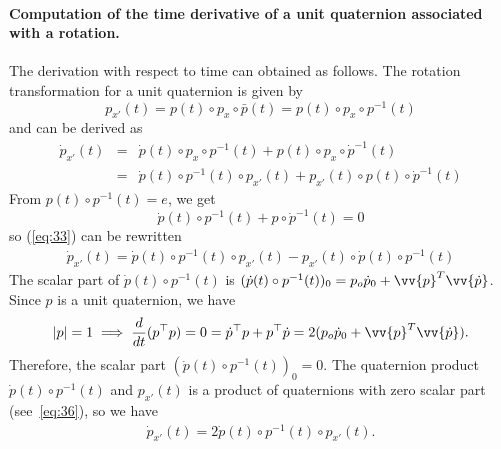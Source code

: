\paragraph{Computation of the time derivative of a unit  quaternion associated with a rotation.}
The derivation with respect to time can obtained as follows. The rotation transformation for a unit quaternion is given by
\begin{equation}
  \label{eq:33}
  p_{x'}(t) = p(t) \circ p_x \circ \bar p(t) =  p(t) \circ p_x \circ p^{-1}(t)
\end{equation}
and can be derived as
\begin{equation}
  \label{eq:33}
  \begin{array}{lcl}
    \dot p_{x'}(t) &=& \dot p(t) \circ p_x \circ p^{-1}(t) + p(t) \circ p_x \circ \dot p^{-1}(t) \\
                  &=& \dot p(t) \circ p^{-1}(t)  \circ   p_{x'}(t)  +      p_{x'}(t) \circ p(t)  \circ \dot p^{-1}(t)    
  \end{array}
\end{equation}
From $p(t) \circ p^{-1}(t) =e$, we get
\begin{equation}
  \label{eq:34}
  \dot p(t) \circ p^{-1}(t) + p \circ \dot p^{-1}(t) = 0
\end{equation}
so (\ref{eq:33}) can be rewritten
\begin{equation}
  \label{eq:35}
  \begin{array}{lcl}
    \dot p_{x'}(t) = \dot p(t) \circ p^{-1}(t)   \circ   p_{x'}(t)  -    p_{x'}(t) \circ  \dot p(t) \circ p^{-1}(t)
  \end{array}
\end{equation}
The scalar part of $\dot p(t) \circ p^{-1}(t)$ is $(\dot p(t) \circ p^{-1}(t))_0 = p_o \dot p_0 + \vv{p}^T\vv{\dot p}$. Since $p$ is a unit quaternion, we have
\begin{equation}
  \label{eq:46}
  |p|=1 \implies \frac{d}{dt} (p^\top p) = 0 =  \dot p^\top p + p^\top \dot p =   2( p_o \dot p_0 + \vv{p}^T\vv{\dot p}).
\end{equation}
Therefore, the scalar part $(\dot p(t) \circ p^{-1}(t))_0 =0$.
The quaternion product $\dot p(t) \circ p^{-1}(t)$ and  $p_{x'}(t)$ is a product of quaternions with zero scalar part (see~\eqref{eq:36}), so we have 
\begin{equation}
  \label{eq:35}
  \begin{array}{lcl}
    \dot p_{x'}(t) = 2 \dot p(t) \circ p^{-1}(t)   \circ p_{x'}(t).
  \end{array}
\end{equation}
